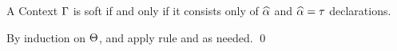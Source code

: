 \begin{definition}[Softness]
  A Context $\Gamma$ is soft if and only if it consists only of $\widehat{\alpha}$ and
  $\widehat{\alpha} = \tau$ declarations.
\end{definition}

\begin{lemma}[\RightSoftnessName]
  \label{lemma:\RightSoftnessName}
  \RightSoftnessBody
\end{lemma}
\proof

By induction on $\Theta$, and apply rule  and  as needed.
\qed

\begin{lemma}[\ExtensionOrderName]\leavevmode
  \label{lemma:\ExtensionOrderName}
  \ExtensionOrderBody
\end{lemma}
\proof

